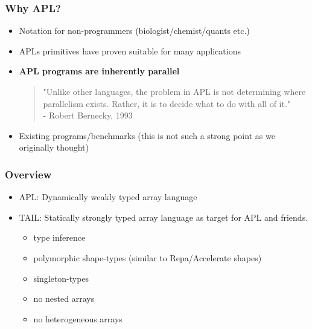 \documentclass{beamer}
\begin{document}
\begin{frame}
\frametitle{Why APL?}
\begin{itemize}
\item 
Notation for non-programmers (biologist/chemist/quants etc.)
\item 
APLs primitives have proven suitable for many applications
\item 
\textbf{APL programs are inherently parallel}
  \begin{quotation}
    \noindent
    "Unlike other languages, the problem in APL is not determining
    where parallelism exists. Rather, it is to decide what to do with
    all of it." \\
      - Robert Bernecky, 1993
  \end{quotation}
\item Existing programs/benchmarks (this is not such a strong point as
  we originally thought)
\end{itemize}

\end{frame}

\begin{frame}
\frametitle{Overview}

\begin{itemize}
\item APL: Dynamically weakly typed array language
\item TAIL: Statically strongly typed array language as target for APL
  and friends.
  \begin{itemize}
  \item type inference
  \item polymorphic shape-types (similar to Repa/Accelerate shapes)
  \item singleton-types
  \item no nested arrays
  \item no heterogeneous arrays
  \end{itemize}
\end{itemize}

\end{frame}
\end{document}

